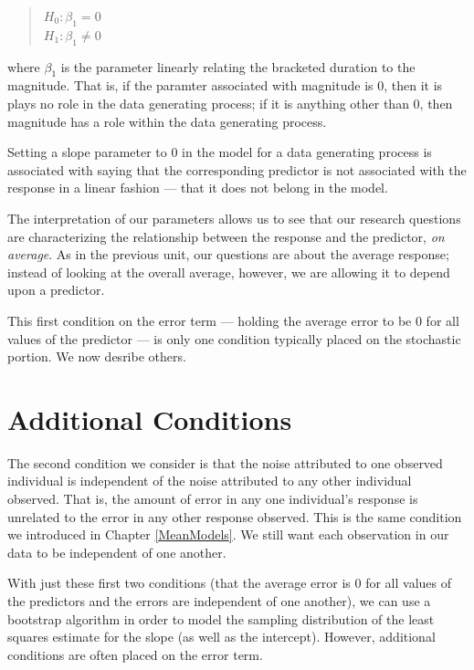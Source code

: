 \documentclass[
]{book}
\theoremstyle{plain}
\theoremstyle{mydefn}
\theoremstyle{myexmpl}
\theoremstyle{remark}
\begin{document}
\begin{quote}
\(H_0: \beta_1 = 0\)\\
\(H_1: \beta_1 \neq 0\)
\end{quote}

where \(\beta_1\) is the parameter linearly relating the bracketed duration to the magnitude. That is, if the paramter associated with magnitude is 0, then it is plays no role in the data generating process; if it is anything other than 0, then magnitude has a role within the data generating process.

\begin{rmdkeyidea}
Setting a slope parameter to 0 in the model for a data generating process is associated with saying that the corresponding predictor is not associated with the response in a linear fashion --- that it does not belong in the model.
\end{rmdkeyidea}

The interpretation of our parameters allows us to see that our research questions are characterizing the relationship between the response and the predictor, \emph{on average}. As in the previous unit, our questions are about the average response; instead of looking at the overall average, however, we are allowing it to depend upon a predictor.

This first condition on the error term --- holding the average error to be 0 for all values of the predictor --- is only one condition typically placed on the stochastic portion. We now desribe others.

\hypertarget{additional-conditions}{%
\section{Additional Conditions}\label{additional-conditions}}

The second condition we consider is that the noise attributed to one observed individual is independent of the noise attributed to any other individual observed. That is, the amount of error in any one individual's response is unrelated to the error in any other response observed. This is the same condition we introduced in Chapter \ref{MeanModels}. We still want each observation in our data to be independent of one another.

With just these first two conditions (that the average error is 0 for all values of the predictors and the errors are independent of one another), we can use a bootstrap algorithm in order to model the sampling distribution of the least squares estimate for the slope (as well as the intercept). However, additional conditions are often placed on the error term.
\end{document}
